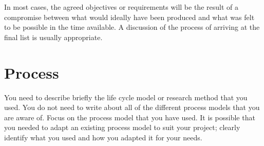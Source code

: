 In most cases, the agreed objectives or requirements will be the result of a compromise between what would ideally have been produced and what was felt to be possible in the time available. A discussion of the process of arriving at the final list is usually appropriate.

\section{Process}
You need to describe briefly the life cycle model or research method that you used. You do not need to write about all of the different process models that you are aware of. Focus on the process model that you have used. It is possible that you needed to adapt an existing process model to suit your project; clearly identify what you used and how you adapted it for your needs.

